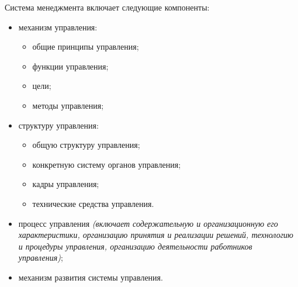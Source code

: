 \documentclass[a4paper,12pt,oneside,final]{extarticle}
\numberwithin{equation}{section}
\begin{document}
Система менеджмента включает следующие компоненты:
\begin{itemize}
	\item механизм управления:
	\begin{itemize}
		\item общие принципы управления;
		\item функции управления; 
		\item цели;
		\item методы управления; 
	\end{itemize}
	\item структуру управления:
	\begin{itemize}
		\item общую структуру управления;
		\item конкретную систему органов управления;
		\item кадры управления;
		\item технические средства управления.
	\end{itemize}
	\item процесс управления \textit{(включает содержательную и организационную его характеристики, организацию принятия и реализации решений, технологию и процедуры управления, организацию деятельности работников управления)};
	\item механизм развития системы управления.
\end{itemize}
\end{document}

